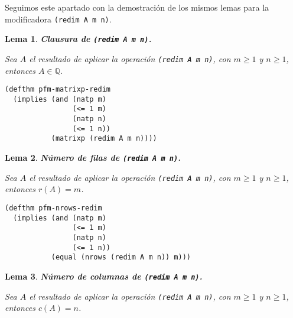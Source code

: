 \documentclass[a4paper,10pt]{article}
\newcommand{\Q}[1]{#1 \in \mathbb{Q}}
\newtheorem{lema}{{Lema}}
\begin{document}
\par \vspace{10pt}

Seguimos este apartado con la demostración de los mismos lemas para la modificadora \texttt{(redim A m n)}.

\par \vspace{16pt}

\begin{lema} \textbf{Clausura de \texttt{(redim A m n)}.}\vspace{8pt}\par
Sea $A$ el resultado de aplicar la operación \texttt{(redim A m n)}, con $m \geq 1$ y $n \geq 1$, entonces $\Q{A}$. 
\end{lema}

\begin{lstlisting}[language=clips]
(defthm pfm-matrixp-redim
  (implies (and (natp m)
                (<= 1 m)
                (natp n)
                (<= 1 n))
           (matrixp (redim A m n))))
\end{lstlisting}

\par \vspace{16pt}

\begin{lema} \textbf{Número de filas de \texttt{(redim A m n)}.}\vspace{8pt}\par
Sea $A$ el resultado de aplicar la operación \texttt{(redim A m n)}, con $m \geq 1$ y $n \geq 1$, entonces $r(A) = m$. 
\end{lema}

\begin{lstlisting}[language=clips]
(defthm pfm-nrows-redim
  (implies (and (natp m)
                (<= 1 m)
                (natp n)
                (<= 1 n))
           (equal (nrows (redim A m n)) m)))
\end{lstlisting}

\par \vspace{16pt}

\begin{lema} \textbf{Número de columnas de \texttt{(redim A m n)}.}\vspace{8pt}\par
Sea $A$ el resultado de aplicar la operación \texttt{(redim A m n)}, con $m \geq 1$ y $n \geq 1$, entonces $c(A) = n$. 
\end{lema}
\end{document}
